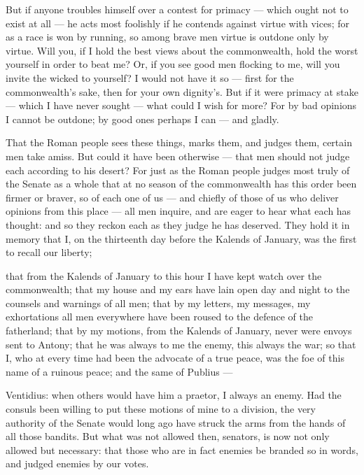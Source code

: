  But if anyone troubles himself over a contest for primacy --- which ought not to exist at all --- he acts most foolishly if he contends against virtue with vices; for as a race is won by running, so among brave men virtue is outdone only by virtue. Will you, if I hold the best views about the commonwealth, hold the worst yourself in order to beat me? Or, if you see good men flocking to me, will you invite the wicked to yourself? I would not have it so --- first for the commonwealth's sake, then for your own dignity's. But if it were primacy at stake --- which I have never sought --- what could I wish for more? For by bad opinions I cannot be outdone; by good ones perhaps I can --- and gladly.

 That the Roman people sees these things, marks them, and judges them, certain men take amiss. But could it have been otherwise --- that men should not judge each according to his desert? For just as the Roman people judges most truly of the Senate as a whole that at no season of the commonwealth has this order been firmer or braver, so of each one of us --- and chiefly of those of us who deliver opinions from this place --- all men inquire, and are eager to hear what each has thought: and so they reckon each as they judge he has deserved. They hold it in memory that I, on the thirteenth day before the Kalends of January, was the first to recall our liberty;

 that from the Kalends of January to this hour I have kept watch over the commonwealth; that my house and my ears have lain open day and night to the counsels and warnings of all men; that by my letters, my messages, my exhortations all men everywhere have been roused to the defence of the fatherland; that by my motions, from the Kalends of January, never were envoys sent to Antony; that he was always to me the enemy, this always the war; so that I, who at every time had been the advocate of a true peace, was the foe of this name of a ruinous peace; and the same of Publius ---

 Ventidius: when others would have him a praetor, I always an enemy. Had the consuls been willing to put these motions of mine to a division, the very authority of the Senate would long ago have struck the arms from the hands of all those bandits. But what was not allowed then, senators, is now not only allowed but necessary: that those who are in fact enemies be branded so in words, and judged enemies by our votes.

